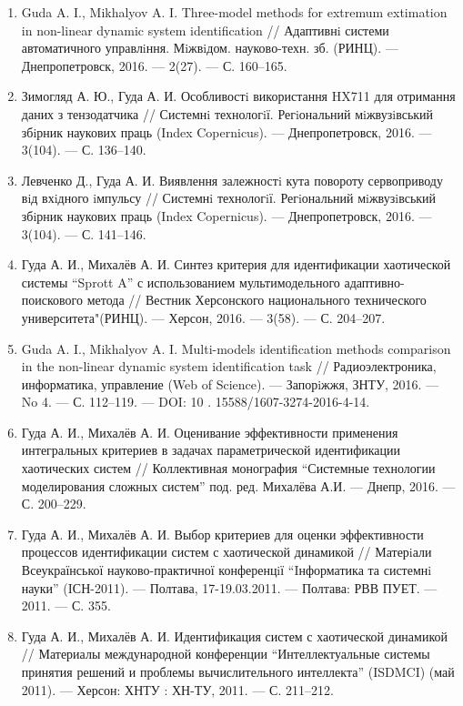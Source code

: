 \begin{enumerate}
\item
Guda A. I., Mikhalyov A. I. Three-model methods for extremum extimation in non-linear
dynamic system identification // Адаптивнi системи автоматичного управлiння.
Мiжвiдом. науково-техн. зб. (РИНЦ). --- Днепропетровск, 2016. --- 2(27). --- С. 160--165.

\item
Зимогляд А. Ю., Гуда А. И. Особливостi використання HX711 для отримання даних з
тензодатчика // Системнi технологiї. Регiональний мiжвузiвський збiрник наукових
праць (Index Copernicus). --- Днепропетровск, 2016. --- 3(104). --- С. 136--140.

\item
Левченко Д., Гуда А. И. Виявлення залежностi кута повороту сервоприводу вiд вхiдного
iмпульсу // Системнi технологiї. Регiональний мiжвузiвський збiрник наукових праць
(Index Copernicus). --- Днепропетровск, 2016. --- 3(104). --- С. 141--146.

\item
Гуда А. И., Михалёв А. И. Синтез критерия для идентификации хаотической системы ``Sprott A''
с использованием мультимодельного адаптивно-поискового метода //
Вестник Херсонского национального технического университета"(РИНЦ). --- Херсон,
2016. --- 3(58). --- С. 204--207.

\item
Guda A. I., Mikhalyov A. I. Multi-models identification methods comparison in the non-linear
dynamic system identification task // Радиоэлектроника, информатика, управление (Web of Science).
--- Запорiжжя, ЗНТУ, 2016. --- No 4. --- С. 112--119. --- DOI: 10 . 15588/1607-3274-2016-4-14.

\item
Гуда А. И., Михалёв А. И. Оценивание эффективности применения интегральных критериев в задачах
параметрической идентификации хаотических систем // Коллективная монография
``Системные технологии моделирования сложных систем'' под. ред.
Михалёва А.И. --- Днепр, 2016. --- С. 200--229.

\item
Гуда А. И., Михалёв А. И. Выбор критериев для оценки эффективности процессов идентификации
систем с хаотической динамикой // Матерiали Всеукраїнської науково-практичної конференцiї
``Iнформатика та системнi науки'' (IСН-2011).
--- Полтава, 17-19.03.2011. --- Полтава: РВВ ПУЕТ. --- 2011. --- С. 355.

\item
Гуда А. И., Михалёв А. И. Идентификация систем с хаотической динамикой
// Материалы международной конференции ``Интеллектуальные системы принятия решений и
проблемы вычислительного интеллекта'' (ISDMCI) (май 2011).
--- Херсон: ХНТУ : ХН-ТУ, 2011. --- С. 211--212.


\end{enumerate}
